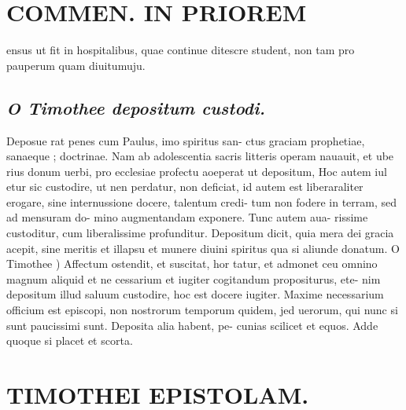 \documentclass{article}
\begin{document}
\begin{pages}
\section*{COMMEN. IN PRIOREM }
\marginpar{[ p.186 ]}\pstart ensus ut fit in hospitalibus, quae continue ditescre student, non tam pro pauperum quam diuitumuju.  \pend
{}
{}
\subsection*{\textit{O Timothee depositum custodi. }}\pstart Deposue rat penes cum Paulus, imo spiritus san- ctus graciam prophetiae, sanaeque ; doctrinae. Nam ab adolescentia sacris litteris operam nauauit, et ube rius donum uerbi, pro ecclesiae profectu aoeperat ut depositum, Hoc autem iul etur sic custodire, ut nen perdatur, non deficiat, id autem est liberaraliter erogare, sine internussione docere, talentum credi- tum non fodere in terram, sed ad mensuram do- mino augmentandam exponere. Tunc autem aua- rissime custoditur, cum liberalissime profunditur.  \pend\pstart Depositum dicit, quia mera dei gracia acepit, sine meritis et illapsu et munere diuini spiritus qua si aliunde donatum.  \pend\pstart O Timothee ) Affectum ostendit, et suscitat, hor tatur, et admonet ceu omnino magnum aliquid et ne cessarium et iugiter cogitandum propositurus, ete- nim depositum illud saluum custodire, hoc est docere iugiter. Maxime necessarium officium est episcopi, non nostrorum temporum quidem, jed uerorum, qui nunc si sunt paucissimi sunt. Deposita alia habent, pe- cunias scilicet et equos. Adde quoque si placet et scorta.  \pend
\section*{TIMOTHEI EPISTOLAM. }
\marginpar{[ p.187 ]}
{}

\end{pages}
\end{document}
